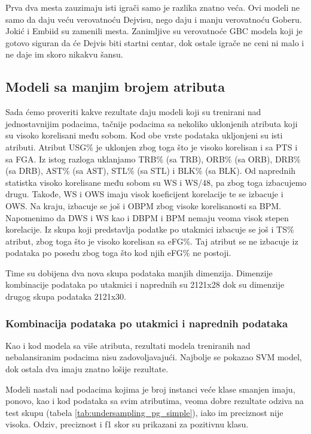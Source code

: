\documentclass[a4paper]{article}
\begin{document}
Prva dva mesta zauzimaju isti igrači samo je razlika znatno veća. Ovi modeli ne samo da daju veću verovatnoću Dejvisu, nego daju i manju verovatnoću Goberu. Jokić i Embiid su zamenili mesta. Zanimljive su verovatnoće GBC modela koji je gotovo siguran da će Dejvis biti startni centar, dok ostale igrače ne ceni ni malo i ne daje im skoro nikakvu šansu.


\subsection{Modeli sa manjim brojem atributa}
\label{subsec:manje_atributa}

Sada ćemo proveriti kakve rezultate daju modeli koji su trenirani nad jednostavnijim podacima, tačnije podacima sa nekoliko uklonjenih atributa koji su visoko korelisani među sobom. Kod obe vrste podataka ukljonjeni su isti atributi. Atribut USG\% je uklonjen zbog toga što je visoko korelisan i sa PTS i sa FGA. Iz istog razloga uklanjamo TRB\% (sa TRB), ORB\% (sa ORB), DRB\% (sa DRB), AST\% (sa AST), STL\% (sa STL) i BLK\% (sa BLK). Od naprednih statistka visoko korelisane među sobom su WS i WS/48, pa zbog toga izbacujemo drugu. Takođe, WS i OWS imaju visok koeficijent korelacije te se izbacuje i OWS. Na kraju, izbacuje se još i OBPM zbog visoke korelisanosti sa BPM. Napomenimo da DWS i WS kao i DBPM i BPM nemaju veoma visok stepen korelacije. Iz skupa koji predstavlja podatke po utakmici izbacuje se još i TS\% atribut, zbog toga što je visoko korelisan sa eFG\%. Taj atribut se ne izbacuje iz podataka po posedu zbog toga što kod njih eFG\% ne postoji.

Time su dobijena dva nova skupa podataka manjih dimenzija. Dimenzije kombinacije podataka po utakmici i naprednih su 2121x28 dok su dimenzije drugog skupa podataka 2121x30.

\subsubsection{Kombinacija podataka po utakmici i naprednih podataka}
\label{subsubsec:kombo_pg_adv_simple}

Kao i kod modela sa više atributa, rezultati modela treniranih nad nebalansiranim podacima nisu zadovoljavajući. Najbolje se pokazao SVM model, dok ostala dva imaju znatno lošije rezultate.

Modeli nastali nad podacima kojima je broj instanci veće klase smanjen imaju, ponovo, kao i kod podataka sa svim atributima, veoma dobre rezultate odziva na test skupu (tabela \ref{tab:undersampling_pg_simple}), iako im preciznost nije visoka. Odziv, preciznost i f1 skor su prikazani za pozitivnu klasu.
\end{document}
